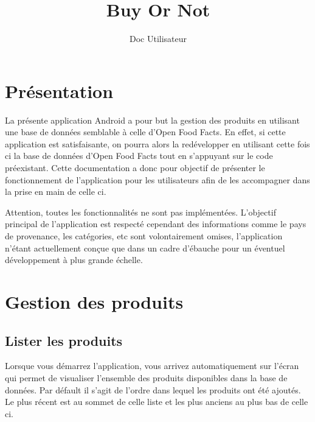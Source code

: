 \documentclass[report]{BetterDocument}
\title{Buy Or Not}
\subtitle{Doc Utilisateur}
\date{}
\newcommand{\ofc}{Open Food Facts}
\newcommand{\bdd}{base de données}
\begin{document}
	\pageDeGarde

	\tableDesMatieres

	\chapter{Présentation}

	La présente application Android a pour but la gestion des produits en utilisant une \bdd{} semblable à celle d'\ofc{}. En effet, si cette application est satisfaisante, on pourra alors la redévelopper en utilisant cette fois ci la \bdd{} d'\ofc{} tout en s'appuyant sur le code préexistant. Cette documentation a donc pour objectif de présenter le fonctionnement de l'application pour les utilisateurs afin de les accompagner dans la prise en main de celle ci.

	Attention, toutes les fonctionnalités ne sont pas implémentées. L'objectif principal de l'application est respecté cependant des informations comme le pays de provenance, les catégories, etc sont volontairement omises, l'application n'étant actuellement conçue que dans un cadre d'ébauche pour un éventuel développement à plus grande échelle.

	\chapter{Gestion des produits}
	\section{Lister les produits}

	Lorsque vous démarrez l'application, vous arrivez automatiquement sur l'écran qui permet de visualiser l'ensemble des produits disponibles dans la \bdd{}. Par défault il s'agit de l'ordre dans lequel les produits ont été ajoutés. Le plus récent est au sommet de celle liste et les plus anciens au plus bas de celle ci.
\end{document}
